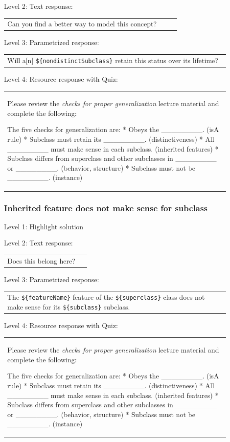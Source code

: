 \noindent Level 2: Text response: \medskip

\begin{tabular}{|p{0.9\linewidth}}
Can you find a better way to model this concept?
\end{tabular} \medskip

\noindent Level 3: Parametrized response: \medskip

\begin{tabular}{|p{0.9\linewidth}}
Will a[n] \verb|${nondistinctSubclass}| retain this status over its lifetime?
\end{tabular} \medskip

\noindent Level 4: Resource response with Quiz: \medskip

\begin{tabular}{|p{0.9\linewidth}}
Please review the \textit{checks for proper generalization} lecture material
and complete the following:

The five checks for generalization are:
* Obeys the ________. (isA rule)
* Subclass must retain its ________. (distinctiveness)
* All ________ must make sense in each subclass. (inherited features)
* Subclass differs from superclass and other subclasses in ________ or ________. 
(behavior, structure)
* Subclass must not be ________. (instance)
\end{tabular} \medskip


\subsubsection{Inherited feature does not make sense for subclass}

\noindent Level 1: Highlight solution \medskip

\noindent Level 2: Text response: \medskip

\begin{tabular}{|p{0.9\linewidth}}
Does this belong here?
\end{tabular} \medskip

\noindent Level 3: Parametrized response: \medskip

\begin{tabular}{|p{0.9\linewidth}}
The \verb|${featureName}| feature of the \verb|${superclass}| class does not make sense for its \verb|${subclass}| subclass.
\end{tabular} \medskip

\noindent Level 4: Resource response with Quiz: \medskip

\begin{tabular}{|p{0.9\linewidth}}
Please review the \textit{checks for proper generalization} lecture material
and complete the following:

The five checks for generalization are:
* Obeys the ________. (isA rule)
* Subclass must retain its ________. (distinctiveness)
* All ________ must make sense in each subclass. (inherited features)
* Subclass differs from superclass and other subclasses in ________ or ________. 
(behavior, structure)
* Subclass must not be ________. (instance)
\end{tabular} \medskip


